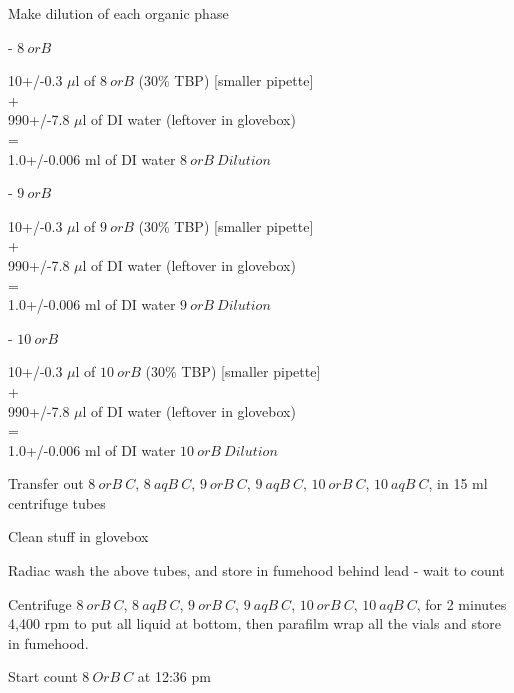 \documentclass[idxtotoc,hyperref,openany,oneside]{labbook} %
\newcommand{\cmark}{\ding{51}}%
\newcommand{\done}{\rlap{$\square$}{\raisebox{2pt}{\large\hspace{1pt}\cmark}}%
  \hspace{-2.5pt}}
\begin{document}
\begin{todolist}
\item[\done]{Make dilution of each organic phase}
  \begin{todolist}
  \item[\done]{- $\boxed{8\ orB}$}
  \end{todolist}
  \begin{center}
    10+/-0.3 $\mu$l of $\boxed{8\ orB}$
    (30\% TBP) [smaller pipette]\\
    +\\
    990+/-7.8 $\mu$l of DI water (leftover in glovebox)\\
    =\\
    1.0+/-0.006 ml of DI water $\boxed{8\ orB\ Dilution}$
  \end{center}
  \begin{todolist}
  \item[\done]{- $\boxed{9\ orB}$}
  \end{todolist}
  \begin{center}
    10+/-0.3 $\mu$l of $\boxed{9\ orB}$
    (30\% TBP) [smaller pipette]\\
    +\\
    990+/-7.8 $\mu$l of DI water (leftover in glovebox)\\
    =\\
    1.0+/-0.006 ml of DI water $\boxed{9\ orB\ Dilution}$
  \end{center}
  \begin{todolist}
  \item[\done]{- $\boxed{10\ orB}$}
  \end{todolist}
  \begin{center}
    10+/-0.3 $\mu$l of $\boxed{10\ orB}$
    (30\% TBP) [smaller pipette]\\
    +\\
    990+/-7.8 $\mu$l of DI water (leftover in glovebox)\\
    =\\
    1.0+/-0.006 ml of DI water $\boxed{10\ orB\ Dilution}$
  \end{center}
 
\item[\done]{Transfer out $\boxed{8\ orB\ C}$, $\boxed{8\ aqB\ C}$,
  $\boxed{9\ orB\ C}$, $\boxed{9\ aqB\ C}$, $\boxed{10\ orB\ C}$,
  $\boxed{10\ aqB\ C}$, in 15 ml centrifuge tubes}
\item[\done]{Clean stuff in glovebox}
\item[\done]{Radiac wash the above tubes, and store in fumehood behind
  lead - wait to count}
\item[\done]{Centrifuge $\boxed{8\ orB\ C}$, $\boxed{8\ aqB\ C}$,
  $\boxed{9\ orB\ C}$, $\boxed{9\ aqB\ C}$, $\boxed{10\ orB\ C}$,
  $\boxed{10\ aqB\ C}$, for 2 minutes 4,400 rpm to put all liquid at
  bottom, then parafilm wrap all the vials and store in fumehood.}
\item[\done]{Start count $\boxed{8\ OrB\ C}$ at 12:36 pm} 
\end{todolist}
\end{document}
